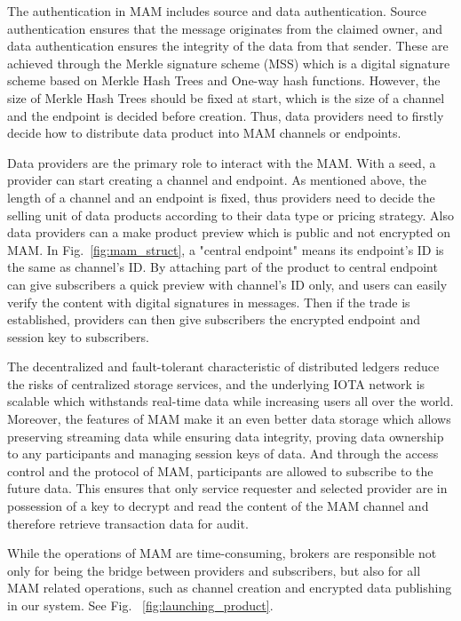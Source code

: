 \documentclass[conference]{IEEEtran}
\begin{document}
The authentication in MAM includes source and data authentication. Source authentication ensures that the message originates from the claimed owner, and data authentication ensures the integrity of the data from that sender. These are achieved through the Merkle signature scheme\cite{MSS} (MSS) which is a digital signature scheme based on Merkle Hash Trees and One-way hash functions. However, the size of Merkle Hash Trees should be fixed at start, which is the size of a channel and the endpoint is decided before creation. Thus, data providers need to firstly decide how to distribute data product into MAM channels or endpoints.

Data providers are the primary role to interact with the MAM. With a seed, a provider can start creating a channel and endpoint. As mentioned above, the length of a channel and an endpoint is fixed, thus providers need to decide the selling unit of data products according to their data type or pricing strategy. Also data providers can a make product preview which is public and not encrypted on MAM. In Fig.~\ref{fig:mam_struct}, a "central endpoint" means its endpoint's ID is the same as channel's ID. By attaching part of the product to central endpoint can give subscribers a quick preview with channel's ID only, and users can easily verify the content with digital signatures in messages. Then if the trade is established, providers can then give subscribers the encrypted endpoint and session key to subscribers.
 
The decentralized and fault-tolerant characteristic of distributed ledgers reduce the risks of centralized storage services, and the underlying IOTA network is scalable which withstands real-time data while increasing users all over the world. Moreover, the features of MAM make it an even better data storage which allows preserving streaming data while ensuring data integrity, proving data ownership to any participants and managing session keys of data. And through the access control and the protocol of MAM, participants are allowed to subscribe to the future data. This ensures that only service requester and selected provider are in possession of a key to decrypt and read the content of the MAM channel and therefore retrieve transaction data for audit.

While the operations of MAM are time-consuming, brokers are responsible not only for being the bridge between providers and subscribers, but also for all MAM related operations, such as channel creation and encrypted data publishing in our system. See Fig.~ \ref{fig:launching_product}.
\end{document}
